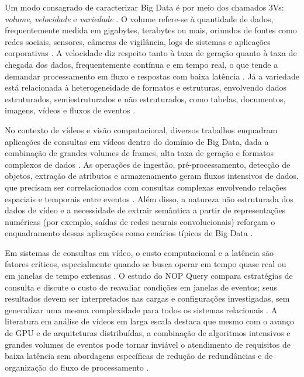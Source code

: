 Um modo consagrado de caracterizar Big Data é por meio dos chamados 3Vs: \textit{volume}, \textit{velocidade} e \textit{variedade} \cite{furht2016,ousous2018}. O volume refere-se à quantidade de dados, frequentemente medida em gigabytes, terabytes ou mais, oriundos de fontes como redes sociais, sensores, câmeras de vigilância, logs de sistemas e aplicações corporativas \cite{ousous2018}. A velocidade diz respeito tanto à taxa de geração quanto à taxa de chegada dos dados, frequentemente contínua e em tempo real, o que tende a demandar processamento em fluxo e respostas com baixa latência \cite{furht2016,alam2020}. Já a variedade está relacionada à heterogeneidade de formatos e estruturas, envolvendo dados estruturados, semiestruturados e não estruturados, como tabelas, documentos, imagens, vídeos e fluxos de eventos \cite{furht2016,ousous2018}.

No contexto de vídeos e visão computacional, diversos trabalhos enquadram aplicações de consultas em vídeos dentro do domínio de Big Data, dada a combinação de grandes volumes de frames, alta taxa de geração e formatos complexos de dados \cite{kossoski2024tese,kossoski2024applsci,alam2020}. As operações de ingestão, pré-processamento, detecção de objetos, extração de atributos e armazenamento geram fluxos intensivos de dados, que precisam ser correlacionados com consultas complexas envolvendo relações espaciais e temporais entre eventos \cite{kossoski2024applsci,alam2020}. Além disso, a natureza não estruturada dos dados de vídeo e a necessidade de extrair semântica a partir de representações numéricas (por exemplo, saídas de redes neurais convolucionais) reforçam o enquadramento dessas aplicações como cenários típicos de Big Data \cite{furht2016,alam2020}.

Em sistemas de consultas em vídeo, o custo computacional e a latência são fatores críticos, especialmente quando se busca operar em tempo quase real ou em janelas de tempo extensas \cite{kossoski2024applsci,alam2020}. O estudo do NOP Query compara estratégias de consulta e discute o custo de reavaliar condições em janelas de eventos; seus resultados devem ser interpretados nas cargas e configurações investigadas, sem generalizar uma mesma complexidade para todos os sistemas relacionais \cite{kossoski2024applsci}. A literatura em análise de vídeos em larga escala destaca que mesmo com o avanço de GPU e de arquiteturas distribuídas, a combinação de algoritmos intensivos e grandes volumes de eventos pode tornar inviável o atendimento de requisitos de baixa latência sem abordagens específicas de redução de redundâncias e de organização do fluxo de processamento \cite{alam2020,kossoski2024applsci}.

